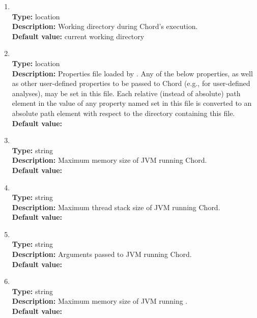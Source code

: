 \begin{enumerate}
\item
{} \\
{\bf Type:} location \\
{\bf Description:} Working directory during Chord's execution. \\
{\bf Default value:} current working directory

\item
{} \\
{\bf Type:} location \\
{\bf Description:} Properties file loaded by .  Any of the below properties, as well as other user-defined properties to be passed to Chord (e.g., for user-defined analyses), may be set in this file.  Each relative (instead of absolute) path element in the value of any property named  set in this file is converted to an absolute path element with respect to the directory containing this file. \\
{\bf Default value:}  

\item
{} \\
{\bf Type:} string \\
{\bf Description:} Maximum memory size of JVM running Chord. \\
{\bf Default value:}  

\item 
{} \\
{\bf Type:} string \\
{\bf Description:} Maximum thread stack size of JVM running Chord. \\
{\bf Default value:}  

\item
{} \\
{\bf Type:} string \\
{\bf Description:} Arguments passed to JVM running Chord. \\
{\bf Default value:}    

\item
{} \\
{\bf Type:} string \\
{\bf Description:} Maximum memory size of JVM running \bddbddb. \\
{\bf Default value:}  


\end{enumerate}
